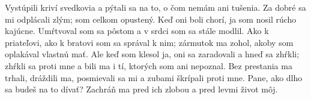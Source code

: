Vystúpili kriví svedkovia
a pýtali sa na to, o čom nemám ani tušenia.
\versseparator
Za dobré sa mi odplácali zlým;
som celkom opustený.
\versseparator
Keď oni boli chorí,
ja som nosil rúcho kajúcne.
\versseparator
Umŕtvoval som sa pôstom
a v srdci som sa stále modlil.
\versseparator
Ako k priateľovi, ako k bratovi som sa správal k nim;
zármutok ma zohol, akoby som oplakával vlastnú mať.
\versseparator
Ale keď som klesol ja, oni sa zaradovali a hneď sa zhŕkli;
zhŕkli sa proti mne a bili ma i tí, ktorých som ani nepoznal.
\versseparator
Bez prestania ma trhali,
dráždili ma, posmievali sa mi
a zubami škrípali proti mne.
\versseparator
Pane, ako dlho sa budeš na to dívať?
Zachráň ma pred ich zlobou
a pred levmi život môj.
